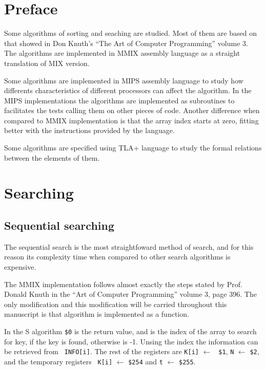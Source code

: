\documentclass[12pt,a4paper]{article}
\begin{document}
\section*{\hfil Preface}

\bigskip

Some algorithms of sorting and seaching are studied. Most of them are
based on that showed in Don Knuth's ``The Art of Computer
Programming'' volume 3. The algorithms are implemented in MMIX
assembly language as a straight translation of MIX version.

Some algorithms are implemented in MIPS assembly language to study how
differents characteristics of different processors can affect the
algorithm. In the MIPS implementations the algorithms are implemented
as subroutines to facilitates the tests calling them on other pieces
of code. Another difference when compared to MMIX implementation is
that the array index starts at zero, fitting better with the
instructions provided by the language.

Some algorithms are specified using TLA+ language to study the formal
relations between the elements of them.

\section{Searching}

\subsection{Sequential searching}

The sequential search is the most straightfoward method of search, and
for this reason its complexity time when compared to other search
algorithms is expensive.

The MMIX implementation follows almost exactly the steps stated by
Prof. Donald Knuth in the ``Art of Computer Programming'' volume 3,
page 396. The only modification and this modification will be carried
throughout this manuscript is that algorithm is implemented as a
function. 

In the S algorithm {\tt \$0} is the return value, and is the index of
the array to search for key, if the key is found, otherwise is
-1. Unsing the index the information can be retrieved from {\tt
  INFO[i]}. The rest of the registers are {\tt K[i]} $\leftarrow$ {\tt
\$1}, {\tt N} $\leftarrow$ {\tt \$2}, and the temporary registers {\tt
K[i]} $\leftarrow$ {\tt \$254} and {\tt t} $\leftarrow$ {\tt \$255}.
\end{document}
